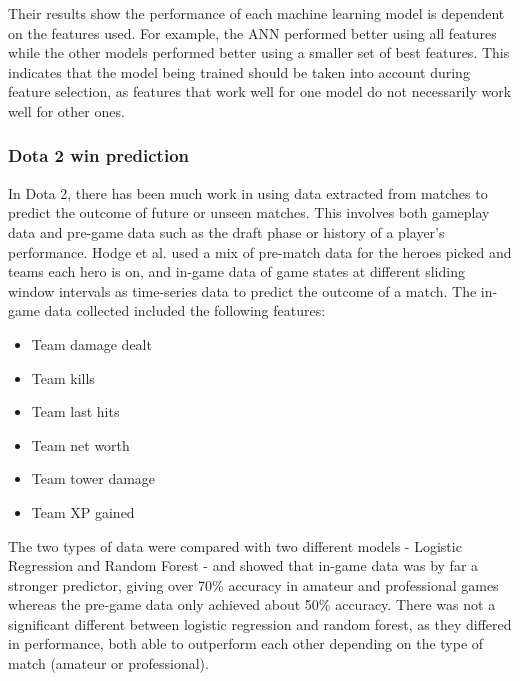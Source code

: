 \documentclass[Report.tex]{subfiles}
\begin{document}
Their results show the performance of each machine learning model is dependent on the features used. For example, the ANN performed better using all features while the other models performed better using a smaller set of best features. This indicates that the model being trained should be taken into account during feature selection, as features that work well for one model do not necessarily work well for other ones. 

\subsubsection{Dota 2 win prediction}
In Dota 2, there has been much work in using data extracted from matches to predict the outcome of future or unseen matches. This involves both gameplay data and pre-game data such as the draft phase or history of a player's performance. Hodge et al. \cite{dota-mixed-rank-win} used a mix of pre-match data for the heroes picked and teams each hero is on, and in-game data of game states at different sliding window intervals as time-series data to predict the outcome of a match. The in-game data collected included the following features:
\begin{itemize}
\item Team damage dealt
\item Team kills
\item Team last hits
\item Team net worth
\item Team tower damage
\item Team XP gained
\end{itemize}
The two types of data were compared with two different models - Logistic Regression and Random Forest - and showed that in-game data was by far a stronger predictor, giving over 70\% accuracy in amateur and professional games whereas the pre-game data only achieved about 50\% accuracy. There was not a significant different between logistic regression and random forest, as they differed in performance, both able to outperform each other depending on the type of match (amateur or professional). 
\end{document}
